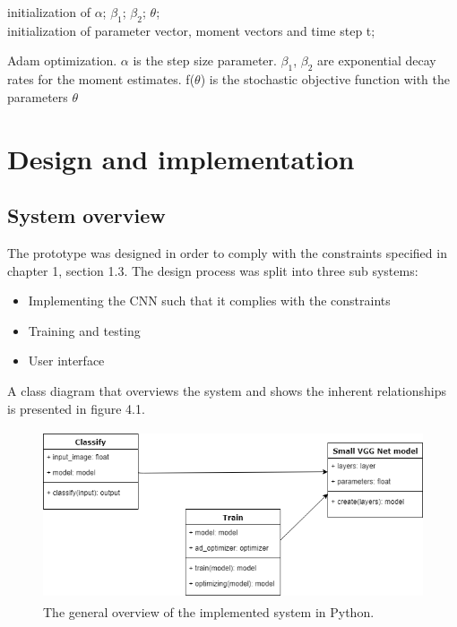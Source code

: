 \documentclass[12pt,a4paper,twoside]{report}
\begin{document}
\begin{algorithm}[H]
\SetAlgoLined
{}
 initialization of $\alpha$;  $\beta_{1}$; $\beta_{2}$; $\theta$; \\
 initialization of parameter vector, moment vectors and time step t; \\
 \caption{Adam optimization. $\alpha$ is the step size parameter. $\beta_{1}$, $\beta_{2}$ are exponential decay rates for the moment estimates. f($\theta$) is the stochastic objective function with the parameters $\theta$ }
\end{algorithm}



\chapter{Design and implementation}
\label{ch:design}
\section{System overview}
The prototype was designed in order to comply with the constraints specified in chapter 1, section 1.3. The design process was split into three sub systems:
\begin{itemize}
    \item Implementing the CNN such that it complies with the constraints
    \item Training and testing
    \item User interface
\end{itemize}

A class diagram that overviews the system and shows the inherent relationships is presented in figure 4.1.


\begin{figure}[h]
	\centering
	\includegraphics[width=13cm, height=5cm]{img/data/imagesystem.png}
	\caption[]
	{The general overview of the implemented system in Python.}
	\label{fig:imagesystem}
\end{figure}\par
\end{document}
